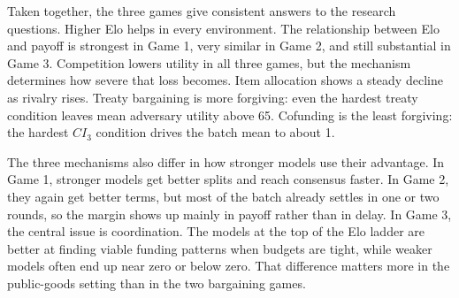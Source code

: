 Taken together, the three games give consistent answers to the research questions. Higher Elo helps in every environment. The relationship between Elo and payoff is strongest in Game 1, very similar in Game 2, and still substantial in Game 3. Competition lowers utility in all three games, but the mechanism determines how severe that loss becomes. Item allocation shows a steady decline as rivalry rises. Treaty bargaining is more forgiving: even the hardest treaty condition leaves mean adversary utility above 65. Cofunding is the least forgiving: the hardest $CI_3$ condition drives the batch mean to about 1.

The three mechanisms also differ in how stronger models use their advantage. In Game 1, stronger models get better splits and reach consensus faster. In Game 2, they again get better terms, but most of the batch already settles in one or two rounds, so the margin shows up mainly in payoff rather than in delay. In Game 3, the central issue is coordination. The models at the top of the Elo ladder are better at finding viable funding patterns when budgets are tight, while weaker models often end up near zero or below zero. That difference matters more in the public-goods setting than in the two bargaining games.

